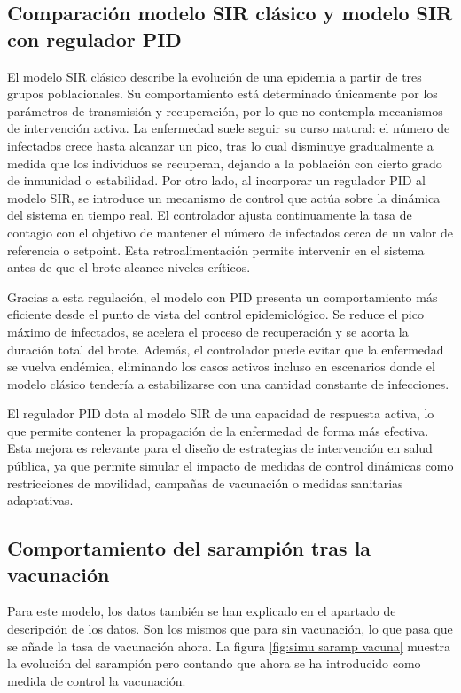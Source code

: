\subsection{Comparación modelo SIR clásico y modelo SIR con regulador PID}


El modelo SIR clásico describe la evolución de una epidemia a partir de tres grupos poblacionales. Su comportamiento está determinado únicamente por los parámetros de transmisión y recuperación, por lo que no contempla mecanismos de intervención activa. La enfermedad suele seguir su curso natural: el número de infectados crece hasta alcanzar un pico, tras lo cual disminuye gradualmente a medida que los individuos se recuperan, dejando a la población con cierto grado de inmunidad o estabilidad.
Por otro lado, al incorporar un regulador PID al modelo SIR, se introduce un mecanismo de control que actúa sobre la dinámica del sistema en tiempo real. El controlador ajusta continuamente la tasa de contagio con el objetivo de mantener el número de infectados cerca de un valor de referencia o setpoint. Esta retroalimentación permite intervenir en el sistema antes de que el brote alcance niveles críticos.

Gracias a esta regulación, el modelo con PID presenta un comportamiento más eficiente desde el punto de vista del control epidemiológico. Se reduce el pico máximo de infectados, se acelera el proceso de recuperación y se acorta la duración total del brote. Además, el controlador puede evitar que la enfermedad se vuelva endémica, eliminando los casos activos incluso en escenarios donde el modelo clásico tendería a estabilizarse con una cantidad constante de infecciones.

El regulador PID dota al modelo SIR de una capacidad de respuesta activa, lo que permite contener la propagación de la enfermedad de forma más efectiva. Esta mejora es relevante para el diseño de estrategias de intervención en salud pública, ya que permite simular el impacto de medidas de control dinámicas como restricciones de movilidad, campañas de vacunación o medidas sanitarias adaptativas.

\subsection{Comportamiento del sarampión tras la vacunación}
Para este modelo, los datos también se han explicado en el apartado de descripción de los datos. Son los mismos que para sin vacunación, lo que pasa que se añade la tasa de vacunación ahora. La figura \ref{fig:simu saramp vacuna} muestra la evolución del sarampión pero contando que ahora se ha introducido como medida de control la vacunación.

